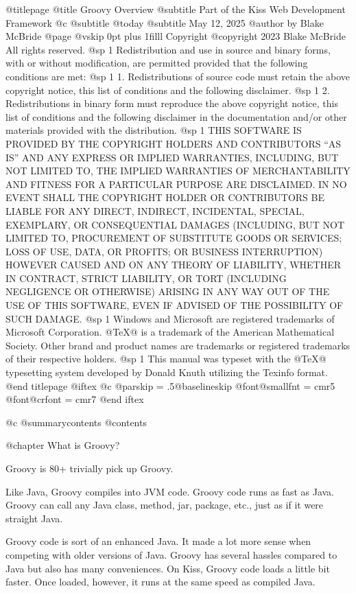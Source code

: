 @titlepage
@title Groovy Overview
@subtitle Part of the Kiss Web Development Framework
@c @subtitle @today{}
@subtitle May 12, 2025
@author by Blake McBride
@page
@vskip 0pt plus 1filll
Copyright  @copyright{} 2023 Blake McBride
All rights reserved.
@sp 1
Redistribution and use in source and binary forms, with or without
modification, are permitted provided that the following conditions are
met:
@sp 1
1. Redistributions of source code must retain the above copyright
notice, this list of conditions and the following disclaimer.
@sp 1
2. Redistributions in binary form must reproduce the above copyright
notice, this list of conditions and the following disclaimer in the
documentation and/or other materials provided with the distribution.
@sp 1
THIS SOFTWARE IS PROVIDED BY THE COPYRIGHT HOLDERS AND CONTRIBUTORS
``AS IS'' AND ANY EXPRESS OR IMPLIED WARRANTIES, INCLUDING, BUT NOT
LIMITED TO, THE IMPLIED WARRANTIES OF MERCHANTABILITY AND FITNESS FOR
A PARTICULAR PURPOSE ARE DISCLAIMED. IN NO EVENT SHALL THE COPYRIGHT
HOLDER OR CONTRIBUTORS BE LIABLE FOR ANY DIRECT, INDIRECT, INCIDENTAL,
SPECIAL, EXEMPLARY, OR CONSEQUENTIAL DAMAGES (INCLUDING, BUT NOT
LIMITED TO, PROCUREMENT OF SUBSTITUTE GOODS OR SERVICES; LOSS OF USE,
DATA, OR PROFITS; OR BUSINESS INTERRUPTION) HOWEVER CAUSED AND ON ANY
THEORY OF LIABILITY, WHETHER IN CONTRACT, STRICT LIABILITY, OR TORT
(INCLUDING NEGLIGENCE OR OTHERWISE) ARISING IN ANY WAY OUT OF THE USE
OF THIS SOFTWARE, EVEN IF ADVISED OF THE POSSIBILITY OF SUCH DAMAGE.
@sp 1
Windows and Microsoft are registered trademarks of
Microsoft Corporation.  @TeX{}@ is a trademark of the American
Mathematical Society. Other brand and product names are trademarks or
registered trademarks of their respective holders.
@sp 1
This manual was typeset with the @TeX{}@ typesetting system developed by
Donald Knuth utilizing the Texinfo format.
@end titlepage
@iftex
@c @parskip = .5@baselineskip
@font@smallfnt = cmr5
@font@crfont = cmr7
@end iftex

@c @summarycontents
@contents

@chapter What is Groovy?


Groovy is 80+%
trivially pick up Groovy.

Like Java, Groovy compiles into JVM code.  Groovy code runs as fast as
Java.  Groovy can call any Java class, method, jar, package, etc., just
as if it were straight Java.

Groovy code is sort of an enhanced Java.  It made a lot more sense
when competing with older versions of Java.  Groovy has several
hassles compared to Java but also has many conveniences.  On Kiss,
Groovy code loads a little bit faster.  Once loaded, however, it runs
at the same speed as compiled Java.



